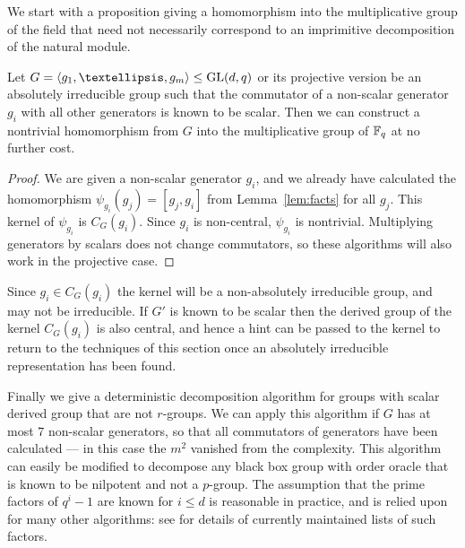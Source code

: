 We start with a proposition giving a homomorphism 
into the multiplicative group of the field that need 
not necessarily correspond to an imprimitive 
decomposition of the natural module.

\begin{Prop}  \label{prop:scal_reduct}
Let $G = \langle g_1, \ldots, g_m \rangle \leq \GL(d, q)$ or 
its projective version
be an absolutely irreducible group such that the commutator 
of a non-scalar generator $g_i$ with all other generators 
is known to be scalar. Then 
we can construct a nontrivial homomorphism from $G$ 
into the multiplicative group of\/ $\mathbb{F}_q$ at no further cost.
\end{Prop}

\begin{proof}
We are given a non-scalar generator $g_i$, 
and we already have calculated the homomorphism $\psi_{g_i}(g_j) = [g_j, g_i]$ from Lemma~\ref{lem:facts} 
for all  $g_j$. 
This
kernel of $\psi_{g_i}$ is $C_G(g_i)$. Since $g_i$ is non-central, $\psi_{g_i}$ 
is nontrivial.
Multiplying generators by scalars does not 
change commutators, 
so these algorithms will also work in the projective case.  %
\end{proof}



Since $g_i \in C_G(g_i)$ the kernel will 
be a non-absolutely irreducible group, and may not be irreducible. 
If $G'$ is known to be scalar then
 the derived group of the kernel $C_G(g_i)$ is also
central, and hence a hint can be passed to the kernel to return 
to the techniques of this section once an absolutely irreducible 
representation has been found.



Finally we give a deterministic decomposition algorithm 
for groups with scalar derived group that are not $r$-groups. 
We can apply this algorithm if $G$ has 
at most $7$ non-scalar generators, so that all commutators of generators 
have been calculated --- in this case the $m^2$ vanished
from the complexity. 
This algorithm can easily be modified to decompose any 
black box group with order oracle that is known to be 
nilpotent and not a $p$-group. 
The assumption that the prime factors of $q^i-1$ 
are known for $i \leq d$ is reasonable in practice, 
and is relied upon for many other algorithms: see 
\cite{brillart} for details of currently maintained lists of such factors.


